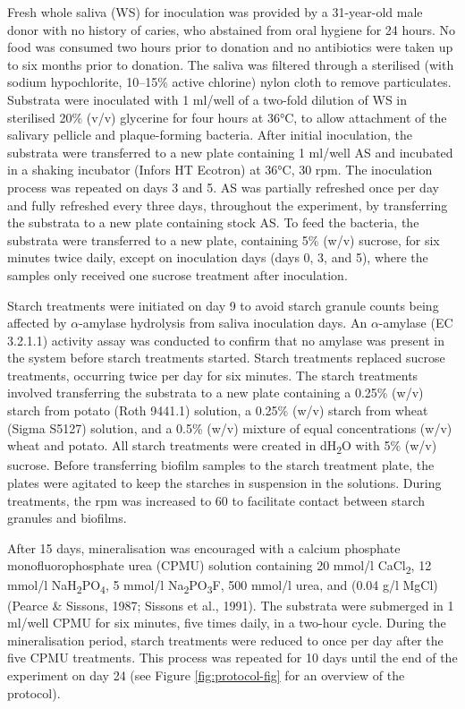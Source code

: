 \documentclass[
]{article}
\begin{document}
Fresh whole saliva (WS) for inoculation was provided by a 31-year-old male donor
with no history of caries, who abstained from oral hygiene for 24 hours. No
food was consumed two hours prior to donation and no antibiotics were taken up
to six months prior to donation.
The saliva was filtered through a sterilised (with sodium hypochlorite, 10--15\% active chlorine)
nylon cloth to remove particulates.
Substrata were inoculated with 1 ml/well of a two-fold dilution of WS in sterilised
20\% (v/v) glycerine for four hours at 36°C, to allow attachment of the
salivary pellicle and plaque-forming bacteria. After initial inoculation, the
substrata were transferred to a new plate containing 1 ml/well AS and incubated
in a shaking incubator (Infors HT Ecotron) at 36°C, 30 rpm.
The inoculation process was repeated on days 3 and 5.
AS was partially refreshed once per day and fully refreshed every three days,
throughout the experiment, by transferring the substrata to a new plate containing
stock AS. To feed the bacteria, the substrata were transferred to a new plate, containing
5\% (w/v) sucrose, for six minutes twice daily, except on inoculation days
(days 0, 3, and 5), where the samples only received one sucrose treatment after
inoculation.

Starch treatments were initiated on day 9 to avoid starch granule counts being
affected by \(\alpha\)-amylase hydrolysis from saliva inoculation days.
An \(\alpha\)-amylase (EC 3.2.1.1) activity
assay was conducted to confirm that no amylase was present in the system before
starch treatments started. Starch treatments replaced sucrose treatments, occurring twice per day
for six minutes. The starch treatments involved transferring the substrata to a
new plate containing a 0.25\% (w/v) starch from potato (Roth 9441.1) solution, a 0.25\% (w/v) starch from wheat (Sigma S5127) solution, and a 0.5\% (w/v) mixture of equal
concentrations (w/v) wheat and potato. All starch treatments were created in dH\textsubscript{2}O
with 5\% (w/v) sucrose. Before transferring biofilm samples to the starch treatment
plate, the plates were agitated to keep the starches in suspension in the
solutions. During treatments, the rpm was increased to 60 to facilitate contact
between starch granules and biofilms.

After 15 days, mineralisation was encouraged with a
calcium phosphate monofluorophosphate urea (CPMU) solution containing
20 mmol/l CaCl\textsubscript{2}, 12 mmol/l NaH\textsubscript{2}PO\textsubscript{4}, 5 mmol/l Na\textsubscript{2}PO\textsubscript{3}F, 500 mmol/l urea,
and (0.04 g/l MgCl)
(Pearce \& Sissons, 1987; Sissons et al., 1991).
The substrata were submerged in 1 ml/well CPMU for six minutes, five times
daily, in a two-hour cycle. During the mineralisation period, starch treatments
were reduced to once per day after the five CPMU treatments. This process was repeated
for 10 days until the end of the experiment on day 24
(see Figure \ref{fig:protocol-fig} for an overview of the protocol).
\end{document}
